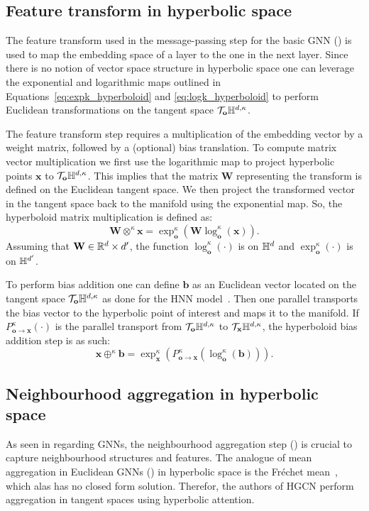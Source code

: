 \subsection{Feature transform in hyperbolic space}
The feature transform used in the message-passing step for the basic GNN () is used to map the embedding space of a layer to the one in the next layer. Since there is no notion of vector space structure in hyperbolic space one can leverage the exponential and logarithmic maps outlined in Equations~\eqref{eq:expk_hyperboloid} and \eqref{eq:logk_hyperboloid} to perform Euclidean transformations on the tangent space $\mathcal{T}_\mathbf{o}\mathbb{H}^{d,\kappa}$. 

The feature transform step requires a multiplication of the embedding vector by a weight matrix, followed by a (optional) bias translation. To compute matrix vector multiplication we first use the logarithmic map to project hyperbolic points $\mathbf{x}$ to $\mathcal{T}_\mathbf{o}\mathbb{H}^{d,\kappa}$. This implies that the matrix $\mathbf{W}$ representing the transform is defined on the Euclidean tangent space. We then project the transformed vector in the tangent space back to the manifold using the exponential map. So, the hyperboloid matrix multiplication is defined as:
\begin{equation*}
    \mathbf{W} \otimes^\kappa \mathbf{x} = \exp_{\mathbf{o}}^\kappa\left(\mathbf{W}\log_{\mathbf{o}}^\kappa(\mathbf{x})\right).
\end{equation*}
Assuming that $\mathbf{W} \in \mathbb{R}^{d}\times d'$, the function $\log_{\mathbf{o}}^\kappa(\cdot)$ is on $\mathbb{H}^{d}$ and $\exp_{\mathbf{o}}^\kappa(\cdot)$ is on $\mathbb{H}^{d'}$. 

To perform bias addition one can define $\mathbf{b}$ as an Euclidean vector located on the tangent space $\mathcal{T}_\mathbf{o}\mathbb{H}^{d,\kappa}$ as done for the HNN model~\cite{ganea2018HNN}. Then one parallel transports the bias vector to the hyperbolic point of interest and maps it to the manifold. If $P_{\mathbf{o}\to \mathbf{x}}^\kappa (\cdot)$ is the parallel transport from $\mathcal{T}_\mathbf{o}\mathbb{H}^{d,\kappa}$ to $\mathcal{T}_{\mathbf{x}}\mathbb{H}^{d,\kappa}$, the hyperboloid bias addition step is as such:
\begin{equation*}
    \mathbf{x} \oplus^\kappa \mathbf{b} = \exp_{\mathbf{x}}^\kappa\left(P_{\mathbf{o}\to \mathbf{x}}^\kappa\left(\log_{\mathbf{o}}^\kappa(\mathbf{b})\right)\right).
\end{equation*}

\subsection{Neighbourhood aggregation in hyperbolic space}
As seen in  regarding GNNs, the neighbourhood aggregation step () is crucial to capture neighbourhood structures and features. The analogue of mean aggregation in Euclidean GNNs () in hyperbolic space is the Fréchet mean~\cite{frechet1948elements}, which alas has no closed form solution. Therefor, the authors of HGCN perform aggregation in tangent spaces using hyperbolic attention.

